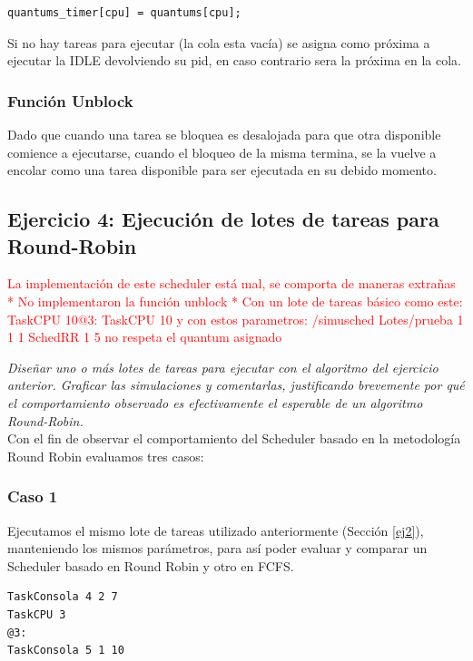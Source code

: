 \documentclass[a4paper]{article}
\begin{document}
\begin{verbatim}
quantums_timer[cpu] = quantums[cpu];
\end{verbatim}

Si no hay tareas para ejecutar (la cola esta vacía) se asigna como próxima a ejecutar la IDLE devolviendo su pid, en caso contrario sera la próxima en la cola.

\subsubsection*{Funci\'on Unblock}	
	
Dado que cuando una tarea se bloquea es desalojada para que otra disponible comience a ejecutarse, cuando el bloqueo de la misma termina, se la vuelve a encolar como una tarea disponible para ser ejecutada en su debido momento. 
\bigskip 
 
 
 \subsection{Ejercicio 4: Ejecuci\'on de lotes de tareas para Round-Robin}

\textcolor{red}{La implementación de este scheduler está mal, se comporta de maneras extrañas * No implementaron la función unblock * Con un lote de tareas básico como este: TaskCPU 10@3: TaskCPU 10 y con estos parametros: /simusched Lotes/prueba 1 1 1 SchedRR 1 5 no respeta el quantum asignado}
 
\textit{Dise\~nar uno o m\'as lotes de tareas para ejecutar con el algoritmo del ejercicio anterior. Graficar las simulaciones y comentarlas, justificando brevemente por qu\'e el comportamiento observado es efectivamente el esperable de un algoritmo Round-Robin.}\\


Con el fin de observar el comportamiento del Scheduler basado en la metodolog\'ia Round Robin evaluamos tres casos:

\subsubsection*{Caso 1}

Ejecutamos el mismo lote de tareas utilizado anteriormente (Secci\'on \ref{ej2}), manteniendo los mismos par\'ametros, para as\'i poder evaluar y comparar un Scheduler basado en Round Robin y otro en FCFS. 

	\begin{codesnippet}
	\begin{verbatim}
TaskConsola 4 2 7
TaskCPU 3
@3:
TaskConsola 5 1 10
	\end{verbatim}
	\end{codesnippet}
\end{document}
